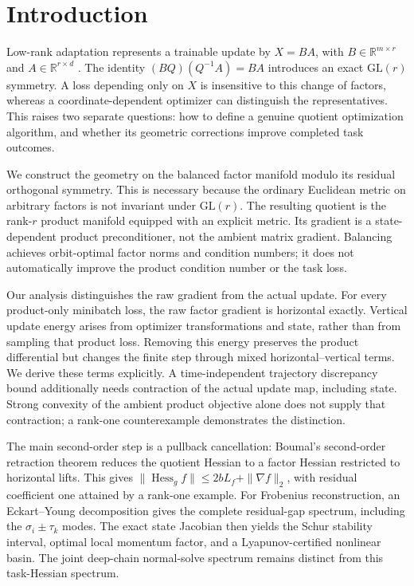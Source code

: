 \section{Introduction}
Low-rank adaptation represents a trainable update by $X=BA$, with $B\in\mathbb R^{m\times r}$ and $A\in\mathbb R^{r\times d}$ \cite{hu2022lora}. The identity $(BQ)(Q^{-1}A)=BA$ introduces an exact $\mathrm{GL}(r)$ symmetry. A loss depending only on $X$ is insensitive to this change of factors, whereas a coordinate-dependent optimizer can distinguish the representatives. This raises two separate questions: how to define a genuine quotient optimization algorithm, and whether its geometric corrections improve completed task outcomes.

We construct the geometry on the balanced factor manifold modulo its residual orthogonal symmetry. This is necessary because the ordinary Euclidean metric on arbitrary factors is not invariant under $\mathrm{GL}(r)$. The resulting quotient is the rank-$r$ product manifold equipped with an explicit metric. Its gradient is a state-dependent product preconditioner, not the ambient matrix gradient. Balancing achieves orbit-optimal factor norms and condition numbers; it does not automatically improve the product condition number or the task loss.

Our analysis distinguishes the raw gradient from the actual update. For every product-only minibatch loss, the raw factor gradient is horizontal exactly. Vertical update energy arises from optimizer transformations and state, rather than from sampling that product loss. Removing this energy preserves the product differential but changes the finite step through mixed horizontal--vertical terms. We derive these terms explicitly. A time-independent trajectory discrepancy bound additionally needs contraction of the actual update map, including state. Strong convexity of the ambient product objective alone does not supply that contraction; a rank-one counterexample demonstrates the distinction.

The main second-order step is a pullback cancellation:
Boumal's second-order retraction theorem
\citep[Proposition 5.45]{boumal2023introduction} reduces the quotient
Hessian to a factor Hessian restricted to horizontal lifts.
This gives $\|\operatorname{Hess}_g f\|\leq2bL_f+\|\nabla f\|_2$,
with residual coefficient one attained by a rank-one example.
For Frobenius reconstruction, an Eckart--Young decomposition gives the
complete residual-gap spectrum, including the $\sigma_i\pm\tau_k$ modes.
The exact state Jacobian then yields the Schur stability interval,
optimal local momentum factor, and a Lyapunov-certified nonlinear basin.
The joint deep-chain normal-solve spectrum remains distinct from this
task-Hessian spectrum.

